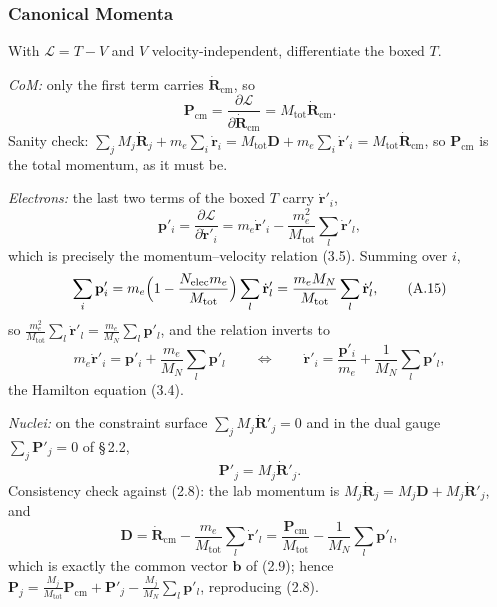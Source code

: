 \subsubsection*{Canonical Momenta}

With $\mathcal L = T - V$ and $V$ velocity-independent, differentiate the boxed $T$.

\noindent\emph{CoM:} only the first term carries $\dot{\mathbf R}_{\mathrm{cm}}$, so
\begin{equation}
\boxed{\;\mathbf P_{\mathrm{cm}} = \frac{\partial \mathcal L}{\partial\dot{\mathbf R}_{\mathrm{cm}}} = M_{\mathrm{tot}}\dot{\mathbf R}_{\mathrm{cm}} .\;} \tag{A.13}
\end{equation}
Sanity check: $\sum_j M_j\dot{\mathbf R}_j + m_e\sum_i\dot{\mathbf r}_i = M_{\mathrm{tot}}\mathbf D + m_e\sum_i\dot{\mathbf r}'_i = M_{\mathrm{tot}}\dot{\mathbf R}_{\mathrm{cm}}$, so $\mathbf P_{\mathrm{cm}}$ is the total momentum, as it must be.

\noindent\emph{Electrons:} the last two terms of the boxed $T$ carry $\dot{\mathbf r}'_i$,
\begin{equation}
\boxed{\;\mathbf p'_i = \frac{\partial \mathcal L}{\partial\dot{\mathbf r}'_i}
= m_e\dot{\mathbf r}'_i - \frac{m_e^2}{M_{\mathrm{tot}}}\sum_l\dot{\mathbf r}'_l ,\;} \tag{A.14}
\end{equation}
which is precisely the momentum--velocity relation (3.5). Summing over $i$,
\begin{equation}
\sum_i\mathbf p'_i = m_e\Bigl(1 - \frac{N_{\mathrm{elec}}m_e}{M_{\mathrm{tot}}}\Bigr)\sum_l\dot{\mathbf r}'_l
= \frac{m_e M_N}{M_{\mathrm{tot}}}\sum_l\dot{\mathbf r}'_l , \tag{A.15}
\end{equation}
so $\frac{m_e^2}{M_{\mathrm{tot}}}\sum_l\dot{\mathbf r}'_l = \frac{m_e}{M_N}\sum_l\mathbf p'_l$, and the relation inverts to
\begin{equation}
m_e\dot{\mathbf r}'_i = \mathbf p'_i + \frac{m_e}{M_N}\sum_l\mathbf p'_l
\qquad\Longleftrightarrow\qquad
\dot{\mathbf r}'_i = \frac{\mathbf p'_i}{m_e} + \frac{1}{M_N}\sum_l\mathbf p'_l , \tag{A.16}
\end{equation}
the Hamilton equation (3.4).

\noindent\emph{Nuclei:} on the constraint surface $\sum_j M_j\dot{\mathbf R}'_j = 0$ and in the dual gauge $\sum_j\mathbf P'_j = 0$ of \S\,2.2,
\begin{equation}
\boxed{\;\mathbf P'_j = M_j\dot{\mathbf R}'_j .\;} \tag{A.17}
\end{equation}
Consistency check against (2.8): the lab momentum is $M_j\dot{\mathbf R}_j = M_j\mathbf D + M_j\dot{\mathbf R}'_j$, and
\begin{equation}
\mathbf D = \dot{\mathbf R}_{\mathrm{cm}} - \frac{m_e}{M_{\mathrm{tot}}}\sum_l\dot{\mathbf r}'_l
= \frac{\mathbf P_{\mathrm{cm}}}{M_{\mathrm{tot}}} - \frac{1}{M_N}\sum_l\mathbf p'_l , \tag{A.18}
\end{equation}
which is exactly the common vector $\mathbf b$ of (2.9); hence $\mathbf P_j = \frac{M_j}{M_{\mathrm{tot}}}\mathbf P_{\mathrm{cm}} + \mathbf P'_j - \frac{M_j}{M_N}\sum_l\mathbf p'_l$, reproducing (2.8).

